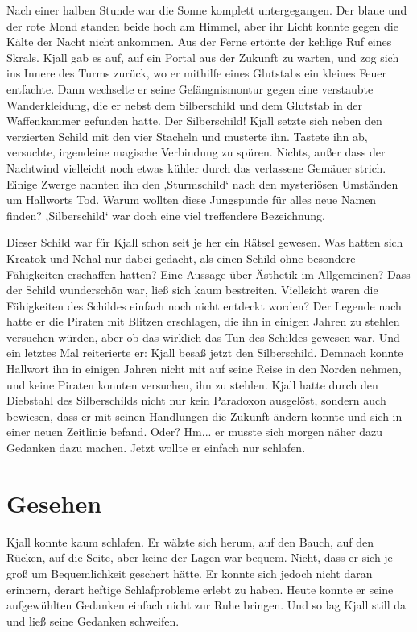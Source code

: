 Nach einer halben Stunde war die Sonne komplett untergegangen. Der blaue und der rote Mond standen beide hoch am Himmel, aber ihr Licht konnte gegen die Kälte der Nacht nicht ankommen. Aus der Ferne ertönte der kehlige Ruf eines Skrals. Kjall gab es auf, auf ein Portal aus der Zukunft zu warten, und zog sich ins Innere des Turms zurück, wo er mithilfe eines Glutstabs ein kleines Feuer entfachte. Dann wechselte er seine Gefängnismontur gegen eine verstaubte Wanderkleidung, die er nebst dem Silberschild und dem Glutstab in der Waffenkammer gefunden hatte. Der Silberschild! Kjall setzte sich neben den verzierten Schild mit den vier Stacheln und musterte ihn. Tastete ihn ab, versuchte, irgendeine magische Verbindung zu spüren. Nichts, außer dass der Nachtwind vielleicht noch etwas kühler durch das verlassene Gemäuer strich. Einige Zwerge nannten ihn den ‚Sturmschild‘ nach den mysteriösen Umständen um Hallworts Tod. Warum wollten diese Jungspunde für alles neue Namen finden? ‚Silberschild‘ war doch eine viel treffendere Bezeichnung.

Dieser Schild war für Kjall schon seit je her ein Rätsel gewesen. Was hatten sich Kreatok und Nehal nur dabei gedacht, als einen Schild ohne besondere Fähigkeiten erschaffen hatten? Eine Aussage über Ästhetik im Allgemeinen? Dass der Schild wunderschön war, ließ sich kaum bestreiten. Vielleicht waren die Fähigkeiten des Schildes einfach noch nicht entdeckt worden? Der Legende nach hatte er die Piraten mit Blitzen erschlagen, die ihn in einigen Jahren zu stehlen versuchen würden, aber ob das wirklich das Tun des Schildes gewesen war. Und ein letztes Mal reiterierte er: Kjall besaß jetzt den Silberschild. Demnach konnte Hallwort ihn in einigen Jahren nicht mit auf seine Reise in den Norden nehmen, und keine Piraten konnten versuchen, ihn zu stehlen. Kjall hatte durch den Diebstahl des Silberschilds nicht nur kein Paradoxon ausgelöst, sondern auch bewiesen, dass er mit seinen Handlungen die Zukunft ändern konnte und sich in einer neuen Zeitlinie befand. Oder? Hm... er musste sich morgen näher dazu Gedanken dazu machen. Jetzt wollte er einfach nur schlafen.

\newpage
\section{Gesehen}


Kjall konnte kaum schlafen. Er wälzte sich herum, auf den Bauch, auf den Rücken, auf die Seite, aber keine der Lagen war bequem. Nicht, dass er sich je groß um Bequemlichkeit geschert hätte. Er konnte sich jedoch nicht daran erinnern, derart heftige Schlafprobleme erlebt zu haben. Heute konnte er seine aufgewühlten Gedanken einfach nicht zur Ruhe bringen. Und so lag Kjall still da und ließ seine Gedanken schweifen.

